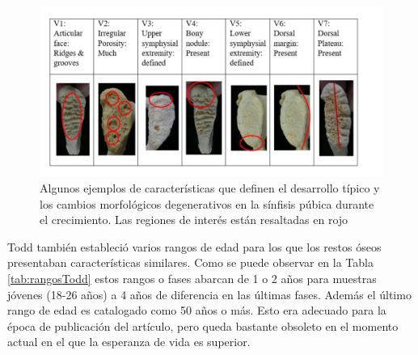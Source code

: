 \begin{figure}[ht!]
    \centering
    \includegraphics[width=\textwidth]{imagenes/Toddfeatures.jpg}
    \caption[Características morfológicas en la sínfisis púbica.]{Algunos ejemplos de características que definen el desarrollo típico y los cambios morfológicos degenerativos en la sínfisis púbica durante el crecimiento. Las regiones de interés están resaltadas en rojo}
    \label{fig:toddfeatures}
\end{figure}

Todd también estableció varios rangos de edad para los que los restos óseos presentaban características similares. Como se puede observar en la Tabla \ref{tab:rangosTodd} estos rangos o fases abarcan de 1 o 2 años para muestras jóvenes (18-26 años) a 4 años de diferencia en las últimas fases. Además el último rango de edad es catalogado como 50 años o más. Esto era adecuado para la época de publicación del artículo, pero queda bastante obsoleto en el momento actual en el que la esperanza de vida es superior.\\ 



